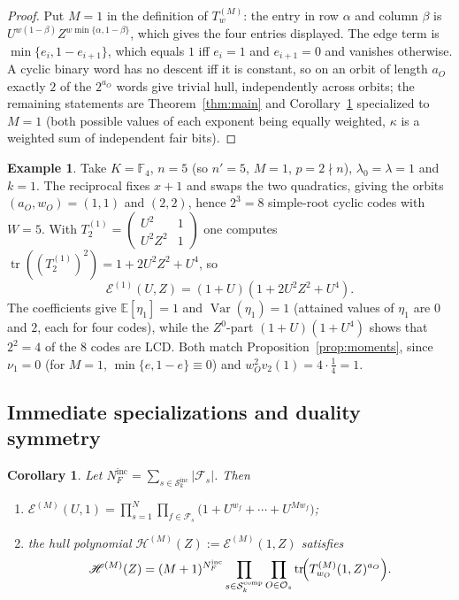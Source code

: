 \documentclass[11pt,a4paper]{article}
\newcommand{\F}{\mathbb F}
\newcommand{\Fs}{\mathcal F_s}
\newcommand{\Os}{\mathcal O_s}
\newcommand{\Epoly}{\mathscr E}
\numberwithin{equation}{section}
\theoremstyle{plain}
\newtheorem{corollary}[theorem]{Corollary}
\theoremstyle{definition}
\newtheorem{example}[theorem]{Example}
\theoremstyle{remark}
\begin{document}
\begin{proof}
Put $M=1$ in the definition of $T^{(M)}_w$: the entry in row $\alpha$ and
column $\beta$ is $U^{w(1-\beta)}Z^{w\min\{\alpha,1-\beta\}}$, which gives the
four entries displayed. The edge term is
$\min\{e_i,1-e_{i+1}\}$, which equals $1$ iff $e_i=1$ and $e_{i+1}=0$ and
vanishes otherwise. A cyclic binary word has no descent iff it is constant, so
on an orbit of length $a_O$ exactly $2$ of the $2^{a_O}$ words give trivial
hull, independently across orbits; the remaining statements are
Theorem~\ref{thm:main} and Corollary~\ref{cor:marginals} specialized to $M=1$
(both possible values of each exponent being equally weighted, $\kappa$ is a
weighted sum of independent fair bits).
\end{proof}

\begin{example}\label{ex:M1}
Take $K=\F_4$, $n=5$ (so $n'=5$, $M=1$, $p=2\nmid n$), $\lambda_0=\lambda=1$
and $k=1$. The reciprocal fixes $x+1$ and swaps the two quadratics, giving the
orbits $(a_O,w_O)=(1,1)$ and $(2,2)$, hence $2^3=8$ simple-root cyclic codes
with $W=5$. With
$T^{(1)}_2=\begin{pmatrix}U^2&1\\ U^2Z^2&1\end{pmatrix}$ one computes
$\operatorname{tr}((T^{(1)}_2)^2)=1+2U^2Z^2+U^4$, so
\[
\Epoly^{(1)}(U,Z)=(1+U)(1+2U^2Z^2+U^4).
\]
The coefficients give $\mathbb{E}[\eta_1]=1$ and $\operatorname{Var}(\eta_1)=1$
(attained values of $\eta_1$ are $0$ and $2$, each for four codes), while the
$Z^0$-part $(1+U)(1+U^4)$ shows that $2^2=4$ of the $8$ codes are LCD. Both
match Proposition~\ref{prop:moments}, since $\nu_1=0$ (for $M=1$,
$\min\{e,1-e\}\equiv0$) and $w_O^2v_2(1)=4\cdot\tfrac14=1$.
\end{example}

\subsection{Immediate specializations and duality symmetry}
\label{sec:specialisations}

\begin{corollary}\label{cor:marginals}
Let $N_F^{\mathrm{inc}}=\sum_{s\in\mathcal{S}_k^{\mathrm{inc}}}|\Fs|$.  Then
\begin{enumerate}
\item[\textup{(i)}]
$\displaystyle
\Epoly^{(M)}(U,1)
 =\prod_{s=1}^{N}\prod_{f\in\Fs}
   \bigl(1+U^{w_f}+\cdots+U^{Mw_f}\bigr)$;
\item[\textup{(ii)}] the hull polynomial
$\mathscr{H}^{(M)}(Z):=\Epoly^{(M)}(1,Z)$ satisfies
\[
\mathscr{H}^{(M)}(Z)
 =(M+1)^{N_F^{\mathrm{inc}}}
  \prod_{s\in\mathcal{S}_k^{\mathrm{comp}}}\prod_{O\in\Os}
   \operatorname{tr}\!\Bigl(T^{(M)}_{w_O}(1,Z)^{a_O}\Bigr).
\]
\end{enumerate}
\end{corollary}
\end{document}
